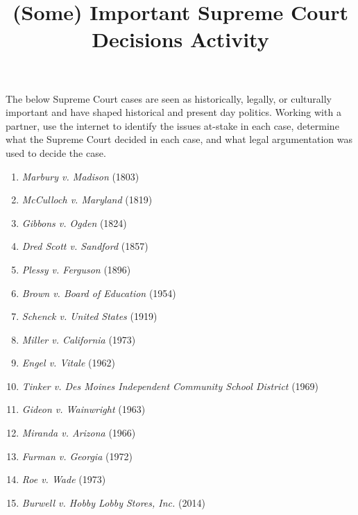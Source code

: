 \documentclass[a4, 12pt]{article}
\title{(Some) Important Supreme Court Decisions Activity\vspace{-2em}}
\author{}
\date{}
\begin{document}
\maketitle

\noindent The below Supreme Court cases are seen as historically, legally, or culturally important and have shaped historical and present day politics. Working with a partner, use the internet to identify the issues at-stake in each case, determine what the Supreme Court decided in each case, and what legal argumentation was used to decide the case.

\vspace{2em}

\begin{enumerate}\itemsep2.5em
\item \textit{Marbury v. Madison} (1803) %
\item \textit{McCulloch v. Maryland} (1819) %
\item \textit{Gibbons v. Ogden} (1824) %

\item \textit{Dred Scott v. Sandford} (1857) %
\item \textit{Plessy v. Ferguson} (1896) %
\item \textit{Brown v. Board of Education} (1954) %

\item \textit{Schenck v. United States} (1919) %
\item \textit{Miller v. California} (1973) %
\item \textit{Engel v. Vitale} (1962) %
\item \textit{Tinker v. Des Moines Independent Community School District} (1969) %


\item \textit{Gideon v. Wainwright} (1963) %
\item \textit{Miranda v. Arizona} (1966) %

\item \textit{Furman v. Georgia} (1972) %


\item \textit{Roe v. Wade} (1973) %
\item \textit{Burwell v. Hobby Lobby Stores, Inc.} (2014) %


\end{enumerate}
\end{document}
